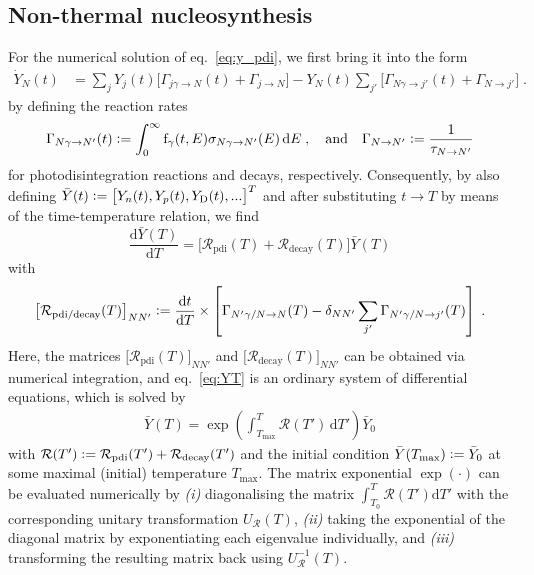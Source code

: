 \documentclass[11pt,a4paper]{article}
\newcommand{\fpdi}{\mathrm{f}}
\renewcommand{\d}{\text{d}}
\newcommand{\eqsp}{\;}
\newcommand{\ldefine}{\vcentcolon=}
\begin{document}
\subsection{Non-thermal nucleosynthesis}
For the numerical solution of eq.~\eqref{eq:y_pdi}, we first bring it into the form
\begin{align}
\dot{Y}_N(t) & = \sum_{j} Y_{j}(t) \big[\Gamma_{j\gamma \rightarrow N}(t) + \Gamma_{j \rightarrow N}\big] - Y_N(t) \sum_{j'} \big[ \Gamma_{N\gamma \rightarrow j'}(t) + \Gamma_{N \rightarrow j'} \big] \eqsp.
\label{eq:y_pdi_redef}
\end{align}
by defining the reaction rates
\begin{align}
\Gamma_{N\gamma \rightarrow N'}(t) \ldefine \int_0^\infty \fpdi_\gamma(t, E) \sigma_{N\gamma \rightarrow N'}(E)\,\d E\eqsp, \quad\text{and}\quad \Gamma_{N\rightarrow N'} \ldefine \frac{1}{\tau_{N\rightarrow N'}}
\end{align}
for photodisintegration reactions and decays, respectively.
Consequently, by also defining $\bar{Y}(t) \ldefine \big[ Y_n(t), Y_p(t), Y_\text{D}(t), ... \big]^T$ and after substituting $t \rightarrow T$ by means of the time-temperature relation, we find
\begin{equation}
\frac{\d \bar{Y}(T)}{\d T} = \big[ \mathcal{R}_\text{pdi}(T) + \mathcal{R}_\text{decay}(T) \big] \bar{Y}(T)
\label{eq:YT}
\end{equation}
with 
\begin{align}
\big[ \mathcal{R}_\text{pdi/decay}(T)\big]_{N N'} \ldefine \frac{\d t}{\d T} \times \left[ \Gamma_{N'\gamma/N \rightarrow N}(T)  - \delta_{N N'} \sum_{j'} \Gamma_{N'\gamma/N\rightarrow j'}(T)\right]\eqsp.
\label{eq:rate_matrix}
\end{align}
Here, the matrices $\big[ \mathcal{R}_\text{pdi}(T)\big]_{N N'}$ and $\big[ \mathcal{R}_\text{decay}(T)\big]_{N N'}$ can be obtained via numerical integration, and eq.~\eqref{eq:YT} is an ordinary system of differential equations, which is solved by
\begin{align}
\bar{Y}(T) = \exp\left(\int_{T_\text{max}}^T \mathcal{R}(T')\,\d T'\right)\bar{Y}_0
\end{align}
with $\mathcal{R}(T') \ldefine \mathcal{R}_\text{pdi}(T') + \mathcal{R}_\text{decay}(T')$ and the initial condition $\bar{Y}(T_\text{max}) \ldefine \bar{Y}_0$ at some maximal (initial) temperature $T_\text{max}$. The matrix exponential $\exp(\cdot)$ can be evaluated numerically by \emph{(i)} diagonalising the matrix $\int_{T_0}^T \mathcal{R}(T')\d T'$ with the corresponding unitary transformation $U_{\mathcal{R}}(T)$, \emph{(ii)} taking the exponential of the diagonal matrix by exponentiating each eigenvalue individually, and \emph{(iii)} transforming the resulting matrix back using $U_{\mathcal{R}}^{-1}(T)$.
\end{document}
